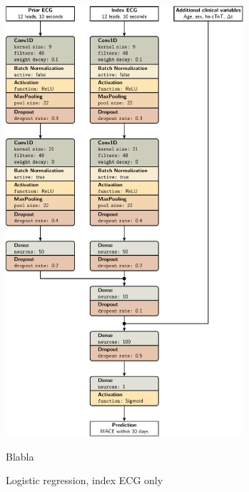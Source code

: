 \documentclass[preprint]{elsarticle}
\begin{document}
\begin{figure}[h!]
\centering
\includegraphics[width=250pt,keepaspectratio]{figures/model-cnn4.pdf}
\caption{Logistic regression, index ECG only}
\medskip
\small
Blabla
\end{figure}
\end{document}
